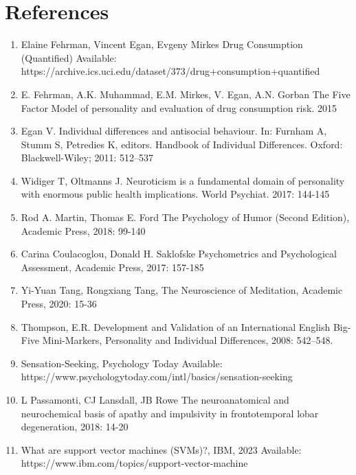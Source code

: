 \documentclass{article}
\begin{document}
\section{References}
\begin{enumerate}
    \item Elaine Fehrman, Vincent Egan, Evgeny Mirkes
            Drug Consumption (Quantified)\newline
            Available:\newline
            https://archive.ics.uci.edu/dataset/373/drug+consumption+quantified

    \item E. Fehrman, A.K. Muhammad, E.M. Mirkes, V. Egan, A.N. Gorban The            Five Factor           Model of personality
            and evaluation of drug consumption risk. 2015
    \item  Egan V. Individual differences and antisocial behaviour. In: Furnham A,
        Stumm S, Petredies K, editors. Handbook of Individual Differences. Oxford:
        Blackwell-Wiley; 2011: 512–537
    \item Widiger T, Oltmanns J. Neuroticism is a fundamental domain of personality with enormous public health implications. World Psychiat. 2017: 144-145
    \item Rod A. Martin, Thomas E. Ford The Psychology of Humor (Second Edition), Academic Press, 2018: 99-140
    \item Carina Coulacoglou, Donald H. Saklofske Psychometrics and Psychological Assessment, Academic Press, 2017: 157-185
    \item Yi-Yuan Tang, Rongxiang Tang, The Neuroscience of Meditation, Academic Press, 2020: 15-36
    \item Thompson, E.R. Development and Validation of an International English Big-Five Mini-Markers, Personality and Individual Differences, 2008: 542–548.
    \item Sensation-Seeking, Psychology Today
    \newline Available: https://www.psychologytoday.com/intl/basics/sensation-seeking
    \item L Passamonti, CJ Lansdall, JB Rowe The neuroanatomical and neurochemical basis of apathy and impulsivity in frontotemporal lobar degeneration, 2018: 14-20
    \item What are support vector machines (SVMs)?, IBM, 2023 \newline
    Available: https://www.ibm.com/topics/support-vector-machine
\end{enumerate}
\end{document}
